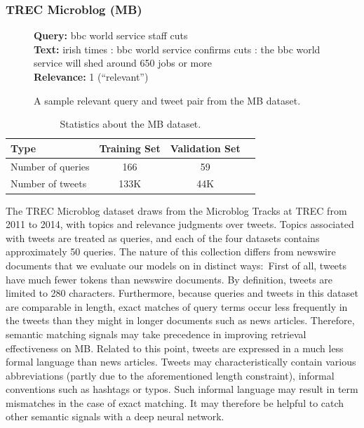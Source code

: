 \subsubsection{TREC Microblog (MB)}

\begin{figure}[b!]
	\begin{framed}
    		\textbf{Query:} bbc world service staff cuts \\
    		\textbf{Text:} irish times : bbc world service confirms cuts : the bbc world service will shed around 650 jobs or more \\
    		\textbf{Relevance:} 1 (``relevant'')
	\end{framed}
\label{mb-example}
 \caption{A sample relevant query and tweet pair from the MB dataset.}
\end{figure}

\begin{table}[t]
\vspace{0.2cm}
\centering
\begin{tabular}{lccc}
\toprule
\textbf{Type} \mbox{\hspace{0.5cm}} & \textbf{Training Set} \mbox{\hspace{1.0cm}} & \textbf{Validation Set} \mbox{\hspace{1.0cm}} \\
\toprule
Number of queries & 166 & 59 \\
Number  of tweets & 133K & 44K  \\
\bottomrule
\end{tabular}
\vspace{0.2cm}
\caption{Statistics about the MB dataset.}
\label{tab:mb-stats}
\end{table}

The TREC Microblog dataset draws from the Microblog Tracks at TREC from 2011 to 2014, with topics and relevance judgments over tweets.
Topics associated with tweets are treated as queries, and each of the four datasets contains approximately 50 queries.
The nature of this collection differs from newswire documents that we evaluate our models on in distinct ways:\
First of all, tweets have much fewer tokens than newswire documents.
By definition, tweets are limited to 280 characters.
Furthermore, because queries and tweets in this dataset are comparable in length, exact matches of query terms occur less frequently in the tweets than they might in longer documents such as news articles.
Therefore, semantic matching signals may take precedence in improving retrieval effectiveness on MB.
Related to this point, tweets are expressed in a much less formal language than news articles.
Tweets may characteristically contain various abbreviations (partly due to the aforementioned length constraint), informal conventions such as hashtags or typos.
Such informal language may result in term mismatches in the case of exact matching.
It may therefore be helpful to catch other semantic signals with a deep neural network.

